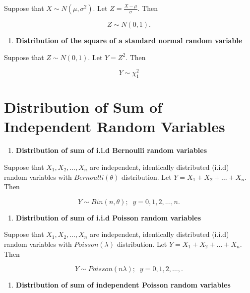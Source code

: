 \documentclass[]{book}
\providecommand{\tightlist}{%
  \setlength{\itemsep}{0pt}\setlength{\parskip}{0pt}}
\begin{document}
Suppose that \(X \sim N(\mu, \sigma^2).\) Let \(Z= \frac{X-\mu}{\sigma}.\) Then

\[Z\sim N(0,1).\]

\begin{enumerate}
\def\labelenumi{\arabic{enumi}.}
\setcounter{enumi}{2}
\tightlist
\item
  \textbf{Distribution of the square of a standard normal random variable}
\end{enumerate}

Suppose that \(Z \sim N(0,1).\) Let \(Y= Z^2.\) Then

\[Y\sim \chi^2_1\]

\newpage

\hypertarget{distribution-of-sum-of-independent-random-variables}{%
\section{Distribution of Sum of Independent Random Variables}\label{distribution-of-sum-of-independent-random-variables}}

\begin{enumerate}
\def\labelenumi{\arabic{enumi}.}
\tightlist
\item
  \textbf{Distribution of sum of i.i.d Bernoulli random variables}
\end{enumerate}

Suppose that \(X_1, X_2, \dots, X_n\) are independent, identically distributed (i.i.d) random variables with \(Bernoulli(\theta)\) distribution. Let \(Y= X_1+X_2+\dots +X_n.\) Then

\[Y\sim Bin(n, \theta); \;\;y=0,1,2,\dots, n.\]

\begin{enumerate}
\def\labelenumi{\arabic{enumi}.}
\setcounter{enumi}{1}
\tightlist
\item
  \textbf{Distribution of sum of i.i.d Poisson random variables}
\end{enumerate}

Suppose that \(X_1, X_2, \dots, X_n\) are independent, identically distributed (i.i.d) random variables with \(Poisson(\lambda)\) distribution. Let \(Y= X_1+X_2+\dots +X_n.\) Then

\[Y\sim Poisson(n\lambda); \;\;y=0,1,2,\dots,.\]

\begin{enumerate}
\def\labelenumi{\arabic{enumi}.}
\setcounter{enumi}{2}
\tightlist
\item
  \textbf{Distribution of sum of independent Poisson random variables}
\end{enumerate}
\end{document}

